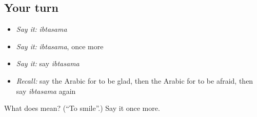 \subsection*{Your turn}
\begin{itemize}
\raggedright
  \item \emph{Say it:} \emph{ibtasama}
  \item \emph{Say it:} \emph{ibtasama}, once more
  \item \emph{Say it:} say \emph{ibtasama}
  \item \emph{Recall:} say the Arabic for to be glad, then the Arabic for to be afraid, then say \emph{ibtasama} again
\end{itemize}

\begin{tcolorbox}[breakable,colback=teal!4,colframe=teal!35!black,title={Before you move on}]
What does  mean? (\textquotedblleft{}To smile\textquotedblright{}.) Say it once more.
\end{tcolorbox}
